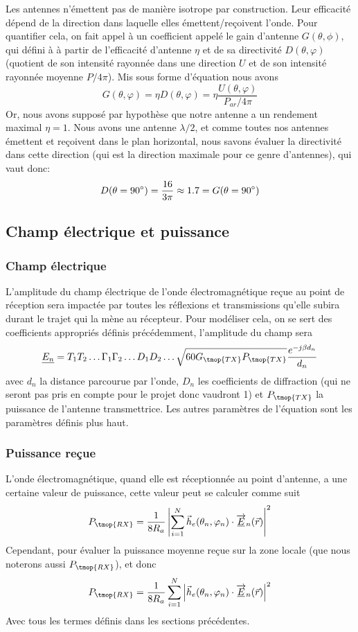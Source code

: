 Les antennes n'{\'e}mettent pas de mani{\`e}re isotrope par construction. Leur
efficacit{\'e} d{\'e}pend de la direction dans laquelle elles
{\'e}mettent/re{\c c}oivent l'onde. Pour quantifier cela, on fait appel {\`a}
un coefficient appel{\'e} le gain d'antenne $G (\theta, \phi)$, qui défini à
{\`a} partir de l'efficacité d'antenne $\eta$ et de sa directivit{\'e} $D (\theta, \varphi)$ (quotient de son intensit{\'e} rayonn{\'e}e
dans une direction $U$ et de son intensit{\'e} rayonn{\'e}e moyenne $P / 4
\pi$). Mis sous forme d'{\'e}quation nous avons
\[ G (\theta, \varphi) = \eta D (\theta, \varphi) = \eta \frac{U (\theta,
   \varphi)}{P_{a r} / 4 \pi} \]
Or, nous avons suppos{\'e} par hypoth{\`e}se que notre antenne a un rendement
maximal $\eta = 1$. Nous avons une antenne $\lambda / 2$, et comme toutes nos
antennes {\'e}mettent et re{\c c}oivent dans le plan horizontal, nous savons
{\'e}valuer la directivit{\'e} dans cette direction (qui est la direction
maximale pour ce genre d'antennes), qui vaut donc:
\[ D (\theta = 90\degree) = \frac{16}{3 \pi} \approx 1.7 = G
   (\theta = 90\degree )\]
\subsection{Champ {\'e}lectrique et puissance }
\subsubsection*{Champ électrique}
L'amplitude du champ {\'e}lectrique de l'onde {\'e}lectromagn{\'e}tique re{\c
c}ue au point de r{\'e}ception sera impact{\'e}e par toutes les r{\'e}flexions
et transmissions qu'elle subira durant le trajet qui la m{\`e}ne au
r{\'e}cepteur. Pour mod{\'e}liser cela, on se sert des coefficients
appropri{\'e}s d{\'e}finis pr{\'e}c{\'e}demment, l'amplitude du champ sera
\[ \underline{E_n} = T_1 T_2 \ldots \Gamma_1 \Gamma_2 \ldots D_1 D_2 \ldots
   \sqrt{60 G_{\tmop{TX}} P_{\tmop{TX}}} \frac{e^{- j \beta d_n}}{d_n} \]
avec $d_n$ la distance parcourue par l'onde, $D_n$ les coefficients de
diffraction (qui ne seront pas pris en compte pour le projet donc vaudront 1)
et $P_{\tmop{TX}}$ la puissance de l'antenne transmettrice. Les autres param{\`e}tres de
l'{\'e}quation sont les param{\`e}tres d{\'e}finis plus haut.
\subsubsection*{Puissance reçue}
L'onde {\'e}lectromagn{\'e}tique, quand elle est r{\'e}ceptionn{\'e}e au point
d'antenne, a une certaine valeur de puissance, cette valeur peut se calculer
comme suit
\[ P_{\tmop{RX}} = \frac{1}{8 R_a} \left| \sum_{i = 1}^N \vec{h}_e (\theta_n,
   \varphi_n) \cdot \overrightarrow{\underline{E}}_n (\vec{r}) \right|^2 \]
Cependant, pour {\'e}valuer la puissance moyenne re{\c c}ue sur la zone locale
(que nous noterons aussi $P_{\tmop{RX}}$), et donc
\[ P_{\tmop{RX}} = \frac{1}{8 R_a} \sum_{i = 1}^N \left| \vec{h}_e (\theta_n,
   \varphi_n) \cdot \overrightarrow{\underline{E}}_n (\vec{r}) \right|^2 \]
Avec tous les termes d{\'e}finis dans les sections pr{\'e}c{\'e}dentes.

\ 